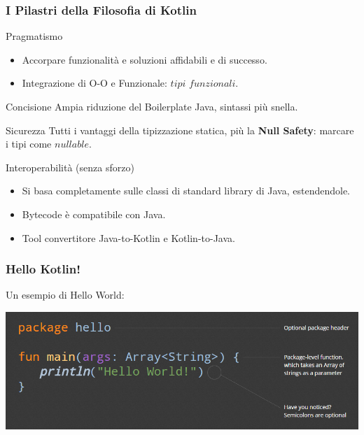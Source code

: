     \begin{frame}
      \frametitle{I Pilastri della Filosofia di Kotlin}
      \begin{block}{Pragmatismo}
        \begin{itemize}
          \item Accorpare funzionalità e soluzioni affidabili e di successo.
          \item Integrazione di O-O e Funzionale: $tipi$ $funzionali$.
        \end{itemize}
      \end{block}
      \begin{block}{Concisione}
        Ampia riduzione del Boilerplate Java, sintassi più snella.
      \end{block}
      \begin{block}{Sicurezza}
        Tutti i vantaggi della tipizzazione statica, più la \textbf{\alert{Null Safety}}: marcare i tipi come $nullable$.
      \end{block}
      \begin{block}{Interoperabilità (senza sforzo)}
        \begin{itemize}
          \item Si basa completamente sulle classi di standard library di Java, estendendole.
          \item Bytecode è compatibile con Java.
          \item Tool convertitore Java-to-Kotlin e Kotlin-to-Java.
        \end{itemize}
      \end{block}
    \end{frame}

    \begin{frame}
      \frametitle{Hello Kotlin!}
      Un esempio di Hello World:
      \begin{center}
        \includegraphics[scale=0.5]{img/HelloWorld}
      \end{center}
    \end{frame}

